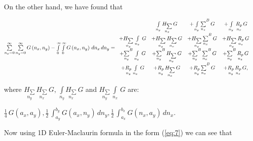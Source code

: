 \documentclass[twoside, 10pt, ptm]{article}
\begin{document}
\begin{multicols}{2}
    On the other hand, we have found that

\noindent
\(\sum\limits_{n_x=0}^{\infty} \sum\limits_{n_y=0}^{\infty} G\left(n_x, n_y\right) -\int\limits_{0}^{\infty} \int\limits_{0}^{\infty} G\left(n_x, n_y\right)\,d{n_x}\,d{n_y} = \\
 \begin{array}{cccc}  \, &  \int\limits_{n_y}^{} \underset{n_x}{H_{\sum}}\,G &  + \int\limits_{n_y}^{}{\sum\limits_{n_x}^{}}^{B}\,G &  + \int\limits_{n_y}^{}\,\underset{n_x}{R_{p}}\,G \\
  +\underset{n_y}{H_{\sum}}\,\int\limits_{n_x}^{}\,G &  + \underset{n_y}{H_{\sum}}\,\underset{n_x}{H_{\sum}}\,G &  + \underset{n_y}{H_{\sum}}\,{\sum\limits_{n_x}^{}}^{B}\,G &  + \underset{n_y}{H_{\sum}}\,\underset{n_x}{R_{p}}\,G \\
  + {\sum\limits_{n_y}^{}}^{B}\,\int\limits_{n_x}^{}\,G &  + {\sum\limits_{n_y}^{}}^{B}\,\underset{n_x}{H_{\sum}}\,G &  + {\sum\limits_{n_y}^{}}^{B}\,{\sum\limits_{n_x}^{}}^{B}\,G &  + {\sum\limits_{n_y}^{}}^{B}\,\underset{n_x}{R_{p}}\,G \\
  + \underset{n_y}{R_{p}}\,\int\limits_{n_x}^{}\,G &  + \underset{n_y}{R_{p}}\,\underset{n_x}{H_{\sum}}\,G &  + \underset{n_y}{R_{p}}\,{\sum\limits_{n_x}^{}}^{B}\,G &  + \underset{n_y}{R_{p}}\,\underset{n_x}{R_{p}}\,G, \end{array}\)

    where \(\underset{n_y}{H_{\sum}}\,\underset{n_x}{H_{\sum}}\,G\),
\(\int\limits_{n_y}^{} \underset{n_x}{H_{\sum}}\,G\) and
\(\underset{n_y}{H_{\sum}}\,\int\limits_{n_x}^{}\,G\) are:

\noindent
    \(\frac{1}{4} \, G\left(a_{x}, a_{y}\right) , \frac{1}{2} \, \int_{a_{y}}^{b_{y}} G\left(a_{x}, n_{y}\right)\,{d n_{y}} , \frac{1}{2} \, \int_{a_{x}}^{b_{x}} G\left(n_{x}, a_{y}\right)\,{d n_{x}}.\)

    Now using 1D Euler-Maclaurin formula in the form (\ref{eq:7}) we can see that



\end{multicols}
\end{document}
